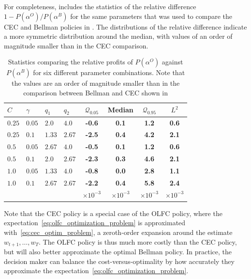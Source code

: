 \documentclass{rsproca_new}
\makeatletter
\theoremstyle{definition}
\renewcommand{\todo}[2][]{\tikzexternaldisable\@todo[#1]{#2}\tikzexternalenable}
\makeatother
\begin{document}
For completeness,  includes the statistics of the relative
difference $1-P(\alpha^O)/P(\alpha^B)$ for the same parameters
that was used to compare the CEC and Bellman policies in .
The distributions of the relative difference indicate a more symmetric
distribution around the median, with values of an order of magnitude
smaller than in the CEC comparison.
\begin{table}[htbp]
  \centering
  \begin{tabular}{llllcccc}
    \toprule
    $C$ & $\gamma$ & $q_1$ & $q_2$ & $\mathcal Q_{0.05}$
    &Median & $\mathcal Q_{0.95}$ &$L^2$\\
    \midrule
    $0.25$ & $0.05$ & $2.0$ & $4.0$
                                   & \textbf{-0.6} & \textbf{0.1} & \textbf{1.2} & \textbf{0.6} \\
    $0.25$ & $0.1$ & $1.33$ & $2.67$
                                   & \textbf{-2.5} & \textbf{0.4} & \textbf{4.2} & \textbf{2.1} \\
    $0.5$ & $0.05$ & $2.67$ & $4.0$
                                   & \textbf{-0.5} & \textbf{0.1} & \textbf{1.2} & \textbf{0.6} \\
    $0.5$ & $0.1$ & $2.0$ & $2.67$
                                   & \textbf{-2.3} & \textbf{0.3} & \textbf{4.6} & \textbf{2.1} \\
    $1.0$ & $0.05$ & $1.33$ & $4.0$
                                   & \textbf{-0.8} & \textbf{0.0} & \textbf{2.8} & \textbf{1.1} \\
    $1.0$ & $0.1$ & $2.67$ & $2.67$
                                   & \textbf{-2.2} & \textbf{0.4} & \textbf{5.8} & \textbf{2.4} \\
        &&&&$\times 10^{-3}$&$\times 10^{-3}$&$\times 10^{-3}$&$\times 10^{-3}$\\
    \bottomrule
  \end{tabular}
  \caption{Statistics comparing the relative profits of $P(\alpha^O)$
    against $P(\alpha^B)$ for six different
    parameter combinations. Note that the values are an order of magnitude
    smaller than in the comparison between Bellman and CEC shown in }\label{tbl:paramcomparisons_olfc}
  \todo[inline]{reference}
\end{table}

Note that the CEC policy is a special case of the OLFC policy, where the
expectation~\eqref{eq:olfc_optimization_problem} is approximated with~\eqref{eq:cec_optim_problem}, a zeroth-order expansion around
the estimate $w_{t+1},\dots,w_T$.
The OLFC policy is thus much more costly than the CEC policy, but will
also better approximate the optimal Bellman policy. In practice, the
decision maker can balance the cost-versus-optimality by how
accurately they
approximate the expectation~\eqref{eq:olfc_optimization_problem}.
\end{document}
